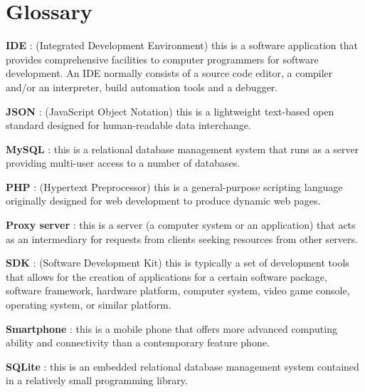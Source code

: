 \chapter*{Glossary}

\vspace{2cm}

\noindent \textbf{IDE} : (Integrated Development Environment) this is a software application that provides comprehensive facilities to computer programmers for software development. An IDE normally consists of a source code editor, a compiler and/or an interpreter, build automation tools and a debugger.

\vspace{3mm}

\noindent \textbf{JSON} : (JavaScript Object Notation) this is a lightweight text-based open standard designed for human-readable data interchange.

\vspace{3mm}

\noindent \textbf{MySQL} : this is a relational database management system that runs as a server providing multi-user access to a number of databases.

\vspace{3mm}

\noindent \textbf{PHP} : (Hypertext Preprocessor) this is a general-purpose scripting language originally designed for web development to produce dynamic web pages.

\vspace{3mm}

\noindent \textbf{Proxy server} : this is a server (a computer system or an application) that acts as an intermediary for requests from clients seeking resources from other servers.

\vspace{3mm}

\noindent \textbf{SDK} : (Software Development Kit) this is typically a set of development tools that allows for the creation of applications for a certain software package, software framework, hardware platform, computer system, video game console, operating system, or similar platform.

\vspace{3mm}

\noindent \textbf{Smartphone} : this is a mobile phone that offers more advanced computing ability and connectivity than a contemporary feature phone.

\vspace{3mm}

\noindent \textbf{SQLite} : this is an embedded relational database management system contained in a relatively small programming library.


\clearpage
